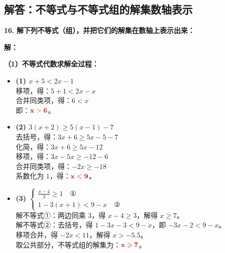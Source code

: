 \newpage

\subsection{解答：不等式与不等式组的解集数轴表示}

\vspace{0.6cm}

\textbf{\LARGE 16.} \textbf{解下列不等式（组），并把它们的解集在数轴上表示出来：}

\vspace{0.4cm}
\textbf{解：}

\textbf{（1）不等式代数求解全过程：}

\begin{itemize}
    \item \textbf{(1) $x + 5 < 2x - 1$} \\
    移项，得：$5 + 1 < 2x - x$ \\
    合并同类项，得：$6 < x$ \\
    即：$\textcolor{red!80!black}{\mathbf{x > 6}}$。

    \vspace{0.2cm}
    \item \textbf{(2) $3(x + 2) \geqslant 5(x - 1) - 7$} \\
    去括号，得：$3x + 6 \geqslant 5x - 5 - 7$ \\
    化简，得：$3x + 6 \geqslant 5x - 12$ \\
    移项，得：$3x - 5x \geqslant -12 - 6$ \\
    合并同类项，得：$-2x \geqslant -18$ \\
    系数化为 $1$，得：$\textcolor{red!80!black}{\mathbf{x \leqslant 9}}$。

    \vspace{0.2cm}
    \item \textbf{(3) $\begin{cases} \frac{x - 4}{3} \geqslant 1 \quad \text{①} \\ 1 - 3(x + 1) < 9 - x \quad \text{②} \end{cases}$} \\
    解不等式①：两边同乘 $3$，得 $x - 4 \geqslant 3$，解得 $x \geqslant 7$。 \\
    解不等式②：去括号，得 $1 - 3x - 3 < 9 - x$，即 $-3x - 2 < 9 - x$。 \\
    移项合并，得 $-2x < 11$，解得 $x > -5.5$。 \\
    取公共部分，不等式组的解集为：$\textcolor{red!80!black}{\mathbf{x \geqslant 7}}$。


\end{itemize}
